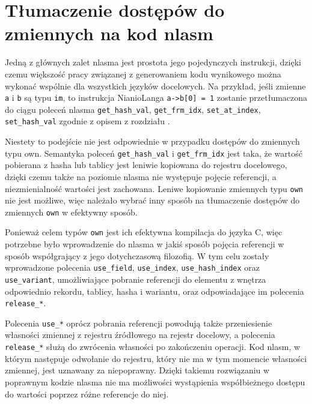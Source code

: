 \documentclass[licencjacka]{pracamgr}
\begin{document}
\section{Tłumaczenie dostępów do zmiennych na kod nlasm}
Jedną z głównych zalet nlasma jest prostota jego pojedynczych instrukcji, dzięki czemu większość
pracy związanej z generowaniem kodu wynikowego można wykonać wspólnie dla wszystkich języków docelowych.
Na przykład, jeśli zmienne \texttt{a} i \texttt{b} są typu \texttt{im}, to instrukcja NianioLanga
\texttt{a->b[0] = 1} zostanie przetłumaczona do ciągu poleceń nlasma
\texttt{get\_hash\_val}, \texttt{get\_frm\_idx}, \texttt{set\_at\_index}, \texttt{set\_hash\_val} zgodnie
z opisem z rozdziału \textit{}.

Niestety to podejście nie jest odpowiednie w przypadku dostępów do zmiennych typu own.
Semantyka poleceń \texttt{get\_hash\_val} i \texttt{get\_frm\_idx} jest taka, że wartość pobierana
z hasha lub tablicy jest leniwie kopiowana do rejestru docelowego, dzięki czemu także na poziomie nlasma
nie występuje pojęcie referencji, a niezmienialność wartości jest zachowana.
Leniwe kopiowanie zmiennych typu \texttt{own} nie jest możliwe, więc należało wybrać inny sposób na
tłumaczenie dostępów do zmiennych \texttt{own} w efektywny sposób.

Ponieważ celem typów \texttt{own} jest ich efektywna kompilacja do języka C, więc potrzebne było
wprowadzenie do nlasma w jakiś sposób pojęcia referencji w sposób współgrający z jego dotychczasową filozofią.
W tym celu zostały wprowadzone polecenia \texttt{use\_field}, \texttt{use\_index}, \texttt{use\_hash\_index} oraz
\texttt{use\_variant}, umożliwiające pobranie referencji do elementu z wnętrza odpowiednio rekordu, tablicy, hasha
i wariantu, oraz odpowiadające im polecenia \texttt{release\_*}.

Polecenia \texttt{use\_*} oprócz pobrania referencji powodują także przeniesienie własności zmiennej z rejestru
źródłowego na rejestr docelowy, a polecenia \texttt{release\_*} służą do zwrócenia własności po zakończeniu
operacji. Kod nlasm, w którym następuje odwołanie do rejestru, który nie ma w tym momencie własności zmiennej,
jest uznawany za niepoprawny. Dzięki takiemu rozwiązaniu w poprawnym kodzie nlasma nie ma możliwości wystąpienia
współbieżnego dostępu do wartości poprzez różne referencje do niej.
\end{document}
